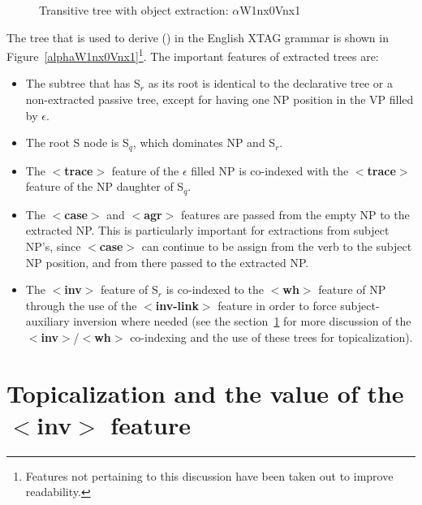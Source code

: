 \begin{figure}[htb]
\centering
\mbox{}
\caption{Transitive tree with object extraction: $\alpha$W1nx0Vnx1}
\label{alphaW1nx0Vnx1}
\label{2;5,1}
\end{figure} 


The tree that is used to derive () in the English XTAG grammar is shown
in Figure~\ref{alphaW1nx0Vnx1}\footnote{Features not pertaining to this
discussion have been taken out to improve readability.}.  The important
features of extracted trees are:

\begin{itemize}
\item The subtree that has S$_{r}$ as its root is identical to the
declarative tree or a non-extracted passive tree, except for having
one NP position in the VP filled by $\epsilon$.

\item The root S node is S$_{q}$, which dominates NP and S$_{r}$.

\item The {\bf $<$trace$>$} feature of the $\epsilon$ filled NP is co-indexed 
with the {\bf $<$trace$>$} feature of the NP daughter of S$_{q}$.

\item The {\bf $<$case$>$} and {\bf $<$agr$>$} features are passed from the 
empty NP to the extracted NP.  This is particularly important for extractions
from subject NP's, since {\bf $<$case$>$} can continue to be assign from the
verb to the subject NP position, and from there passed to the extracted NP.

\item The {\bf $<$inv$>$} feature of S$_{r}$ is co-indexed to the 
{\bf $<$wh$>$} feature of NP through the use of the {\bf $<$inv-link$>$}
feature in order to force subject-auxiliary inversion where needed (see the
section~\ref{topicalization} for more discussion of the {\bf
$<$inv$>$}/{\bf$<$wh$>$} co-indexing and the use of these trees for
topicalization).

\end{itemize}



\section{Topicalization and the value of the {\bf $<$inv$>$} feature}
\label{topicalization}

